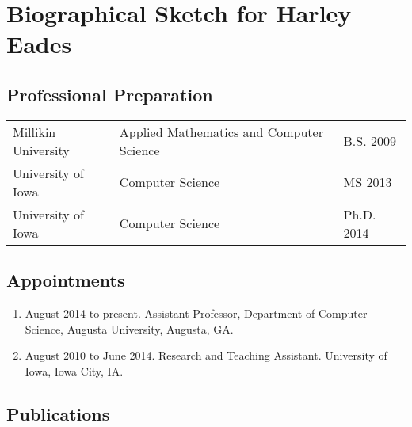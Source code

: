 \section*{Biographical Sketch for Harley Eades}

\subsection*{Professional Preparation}


\begin{tabular}{lll}
  Millikin University  & Applied Mathematics and Computer Science   & B.S. 2009  \\
  University of Iowa   & Computer Science   & MS 2013 \\  
  University of Iowa   & Computer Science   & Ph.D. 2014 \\
\end{tabular}

\subsection*{Appointments}

\begin{enumerate}\itemsep 0pt
\item August 2014 to present.  Assistant Professor, Department of
  Computer Science, Augusta University, Augusta, GA.

\item August 2010 to June 2014. Research and
  Teaching Assistant. University of Iowa, Iowa City, IA.
\end{enumerate}


\subsection*{Publications}


